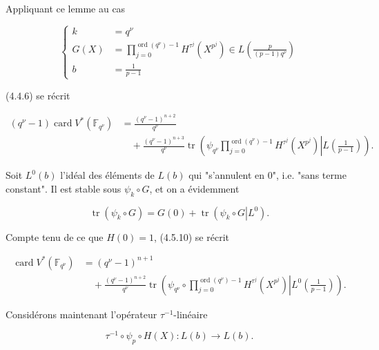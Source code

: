 Appliquant ce lemme au cas

\[
\left\{
\begin{aligned}
k&=q^\nu\\
G(X)&=\prod_{j=0}^{\operatorname{ord}(q^\nu)-1}
H^{\tau^j}(X^{p^j})
\in L\!\left(\frac{p}{(p-1)q^\nu}\right)\\
b&=\frac1{p-1}
\end{aligned}
\right.
\]

(4.4.6) se récrit

\begin{equation}\tag{4.5.10}
\begin{aligned}
(q^\nu-1)\operatorname{card}V^*(\mathbb F_{q^\nu})
&=\frac{(q^\nu-1)^{n+2}}{q^\nu}\\
&\quad+\frac{(q^\nu-1)^{n+3}}{q^\nu}
\operatorname{tr}\!\left(
\left.\psi_{q^\nu}
\prod_{j=0}^{\operatorname{ord}(q^\nu)-1}H^{\tau^j}(X^{p^j})
\right|L\!\left(\frac1{p-1}\right)\right).
\end{aligned}
\end{equation}

Soit $L^0(b)$ l'idéal des éléments de $L(b)$ qui "s'annulent en $0$",
i.e. "sans terme constant". Il est stable sous $\psi_k\circ G$, et on a
évidemment

\begin{equation}\tag{4.5.11}
\operatorname{tr}(\psi_k\circ G)
=G(0)+\operatorname{tr}\!\left(
\left.\psi_k\circ G\right|L^0\right).
\end{equation}

Compte tenu de ce que $H(0)=1$, (4.5.10) se récrit

\begin{equation}\tag{4.5.12}
\begin{aligned}
\operatorname{card}V^*(\mathbb F_{q^\nu})
&=(q^\nu-1)^{n+1}\\
&\quad+\frac{(q^\nu-1)^{n+2}}{q^\nu}
\operatorname{tr}\!\left(
\left.\psi_{q^\nu}\circ
\prod_{j=0}^{\operatorname{ord}(q^\nu)-1}H^{\tau^j}(X^{p^j})
\right|L^0\!\left(\frac1{p-1}\right)\right).
\end{aligned}
\end{equation}


Considérons maintenant l'opérateur $\tau^{-1}$-linéaire

\begin{equation}\tag{4.5.13}
\tau^{-1}\circ\psi_p\circ H(X):L(b)\longrightarrow L(b).
\end{equation}

